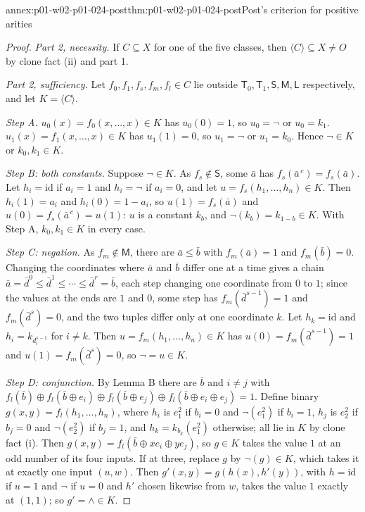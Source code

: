 \begin{annexitem}{annex:p01-w02-p01-024-post}{thm:p01-w02-p01-024-post}{Post's criterion for positive arities}
\begin{proof}
\emph{Part 2, necessity.}  If \(C\subseteq X\) for one of the five classes,
then \(\langle C\rangle\subseteq X\neq O\) by clone fact (ii) and part 1.

\emph{Part 2, sufficiency.}  Let \(f_0,f_1,f_s,f_m,f_l\in C\) lie outside
\(\mathsf T_0,\mathsf T_1,\mathsf S,\mathsf M,\mathsf L\) respectively, and
let \(K=\langle C\rangle\).

\emph{Step A.}  \(u_0(x)=f_0(x,\ldots,x)\in K\) has \(u_0(0)=1\), so
\(u_0=\neg\) or \(u_0=k_1\).  \(u_1(x)=f_1(x,\ldots,x)\in K\) has
\(u_1(1)=0\), so \(u_1=\neg\) or \(u_1=k_0\).  Hence \(\neg\in K\) or
\(k_0,k_1\in K\).

\emph{Step B: both constants.}  Suppose \(\neg\in K\).  As
\(f_s\notin\mathsf S\), some \(\bar a\) has
\(f_s(\bar a^{\,c})=f_s(\bar a)\).  Let \(h_i=\mathrm{id}\) if \(a_i=1\) and
\(h_i=\neg\) if \(a_i=0\), and let \(u=f_s(h_1,\ldots,h_n)\in K\).  Then
\(h_i(1)=a_i\) and \(h_i(0)=1-a_i\), so \(u(1)=f_s(\bar a)\) and
\(u(0)=f_s(\bar a^{\,c})=u(1)\): \(u\) is a constant \(k_b\), and
\(\neg(k_b)=k_{1-b}\in K\).  With Step A, \(k_0,k_1\in K\) in every case.

\emph{Step C: negation.}  As \(f_m\notin\mathsf M\), there are
\(\bar a\leq\bar b\) with \(f_m(\bar a)=1\) and \(f_m(\bar b)=0\).  Changing
the coordinates where \(\bar a\) and \(\bar b\) differ one at a time gives
a chain \(\bar a=\bar d^0\leq\bar d^1\leq\cdots\leq\bar d^r=\bar b\), each
step changing one coordinate from \(0\) to \(1\); since the values at the
ends are \(1\) and \(0\), some step has \(f_m(\bar d^{s-1})=1\) and
\(f_m(\bar d^s)=0\), and the two tuples differ only at one coordinate
\(k\).  Let \(h_k=\mathrm{id}\) and \(h_i=k_{d^{s-1}_i}\) for \(i\neq k\).
Then \(u=f_m(h_1,\ldots,h_n)\in K\) has \(u(0)=f_m(\bar d^{s-1})=1\) and
\(u(1)=f_m(\bar d^s)=0\), so \(\neg=u\in K\).

\emph{Step D: conjunction.}  By Lemma B there are \(\bar b\) and \(i\neq j\)
with \(f_l(\bar b)\oplus f_l(\bar b\oplus e_i)\oplus f_l(\bar b\oplus e_j)
\oplus f_l(\bar b\oplus e_i\oplus e_j)=1\).  Define binary
\(g(x,y)=f_l(h_1,\ldots,h_n)\), where \(h_i\) is \(e^2_1\) if \(b_i=0\) and
\(\neg(e^2_1)\) if \(b_i=1\), \(h_j\) is \(e^2_2\) if \(b_j=0\) and
\(\neg(e^2_2)\) if \(b_j=1\), and \(h_k=k_{b_k}(e^2_1)\) otherwise; all
lie in \(K\) by clone fact (i).  Then
\(g(x,y)=f_l(\bar b\oplus xe_i\oplus ye_j)\), so \(g\in K\) takes the value
\(1\) at an odd number of its four inputs.  If at three, replace \(g\) by
\(\neg(g)\in K\), which takes it at exactly one input \((u,w)\).  Then
\(g'(x,y)=g(h(x),h'(y))\), with \(h=\mathrm{id}\) if \(u=1\) and \(\neg\) if
\(u=0\) and \(h'\) chosen likewise from \(w\), takes the value \(1\) exactly
at \((1,1)\); so \(g'=\land\in K\).


\end{proof}
\end{annexitem}
